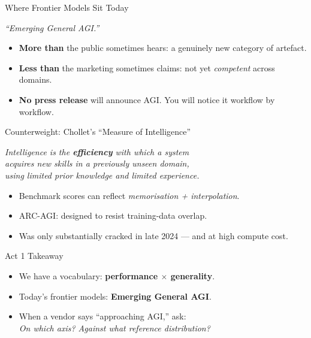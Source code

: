 \documentclass[aspectratio=169, 12pt, xcolor={dvipsnames,table}]{beamer}
\newcommand{\bigquote}[1]{%
  \begin{center}
    \large\itshape ``#1''
  \end{center}
}
\newcommand{\sourcemark}[1]{\hfill{\tiny\color{gray}#1}}
\begin{document}
\begin{frame}{Where Frontier Models Sit Today}
\bigquote{Emerging General AGI.}
\begin{itemize}
  \item \textbf{More than} the public sometimes hears: a genuinely new category of artefact.
  \item \textbf{Less than} the marketing sometimes claims: not yet \emph{competent} across domains.
  \item \textbf{No press release} will announce AGI. You will notice it workflow by workflow.
\end{itemize}
\end{frame}

\begin{frame}{Counterweight: Chollet's ``Measure of Intelligence''}
\begin{center}
\itshape Intelligence is the \textbf{efficiency} with which a system\\ acquires new skills
in a previously unseen domain,\\ using limited prior knowledge and limited experience.
\end{center}
\vspace{0.6em}
\begin{itemize}
  \item Benchmark scores can reflect \emph{memorisation + interpolation}.
  \item ARC-AGI: designed to resist training-data overlap.
  \item Was only substantially cracked in late 2024 --- and at high compute cost.
\end{itemize}
\sourcemark{\citealp{chollet2019measure}}
\end{frame}

\begin{frame}{Act 1 Takeaway}
\begin{itemize}
  \item We have a vocabulary: \textbf{performance $\times$ generality}.
  \item Today's frontier models: \textbf{Emerging General AGI}.
  \item When a vendor says ``approaching AGI,'' ask:\\
        \quad \emph{On which axis? Against what reference distribution?}
\end{itemize}
\end{frame}
\end{document}
